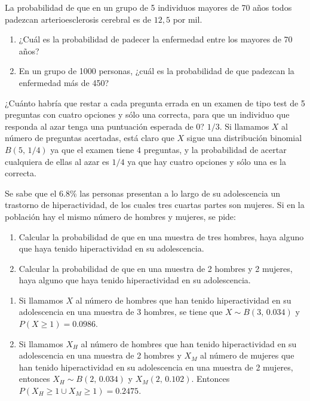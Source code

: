 {La probabilidad de que en un grupo de 5 individuos mayores de 70 años todos padezcan arterioesclerosis cerebral es de $12,5$ por mil.
\begin{enumerate}
\item ¿Cuál es la probabilidad de padecer la enfermedad entre los mayores de 70 años?
\item En un grupo de 1000 personas, ¿cuál es la probabilidad de que padezcan la enfermedad más de 450?
\end{enumerate}
}
{}
{}


{¿Cuánto habría que restar a cada pregunta errada en un examen de tipo test de 5 preguntas con cuatro opciones y sólo
una correcta, para que un individuo que responda al azar tenga una puntuación esperada de 0? 
}
{$1/3$.}
{Si llamamos $X$ al número de preguntas acertadas, está claro que $X$ sigue una distribución binomial $B(5,\,1/4)$ ya
que el examen tiene 4 preguntas, y la probabilidad de acertar cualquiera de ellas al azar es $1/4$ ya que hay cuatro
opciones y sólo una es la correcta.
}


{Se sabe que el $6.8$\% las personas presentan a lo largo de su adolescencia un trastorno de hiperactividad, de los
cuales tres cuartas partes son mujeres.
Si en la población hay el mismo número de hombres y mujeres, se pide:
\begin{enumerate}
\item Calcular la probabilidad de que en una muestra de tres hombres, haya alguno que haya tenido hiperactividad en su
adolescencia. 
\item Calcular la probabilidad de que en una muestra de 2 hombres y 2 mujeres, haya alguno que haya tenido
hiperactividad en su adolescencia. 
\end{enumerate}
}
{
\begin{enumerate}
\item Si llamamos $X$ al número de hombres que han tenido hiperactividad en su adolescencia en una muestra de 3
hombres, se tiene que $X\sim B(3,\,0.034)$ y $P(X\geq 1)=0.0986$.
\item Si llamamos $X_H$ al número de hombres que han tenido hiperactividad en su adolescencia en una muestra de 2
hombres y $X_M$ al número de mujeres que han tenido hiperactividad en su adolescencia en una muestra de 2 mujeres,
entonces $X_H\sim B(2,\,0.034)$ y $X_M(2,\,0.102)$. Entonces $P(X_H\geq 1\cup X_M\geq 1)=0.2475$.
\end{enumerate}
}
{}


